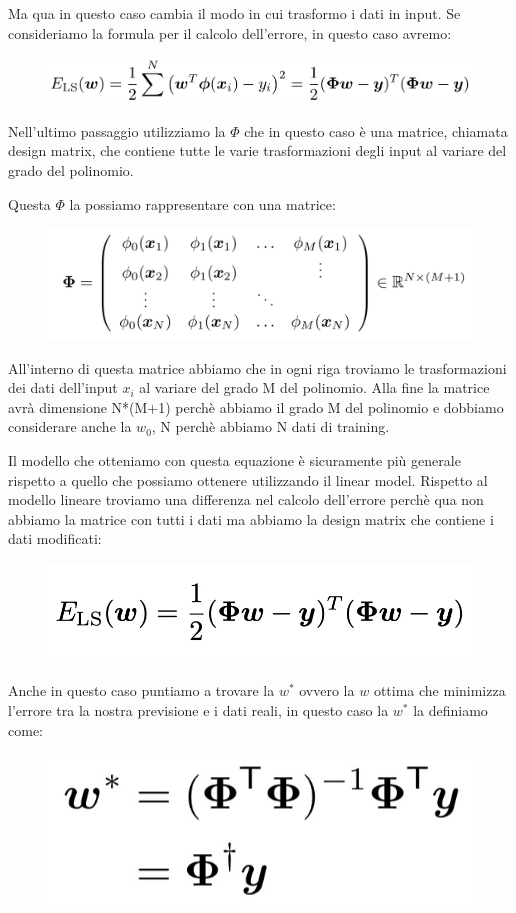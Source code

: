 \documentclass[14pt]{extreport}
\begin{document}
Ma qua in questo caso cambia il modo in cui trasformo i dati in input. Se consideriamo la formula per il calcolo dell'errore, in questo caso avremo:
\begin{figure}[H]
	\centering
	\includegraphics[width=0.7\linewidth]{79.jpeg}
\end{figure}

Nell'ultimo passaggio utilizziamo la $\Phi$ che in questo caso è una matrice, chiamata design matrix, che contiene tutte le varie trasformazioni degli
input al variare del grado del polinomio.

Questa $\Phi$ la possiamo rappresentare con una matrice:

\begin{figure}[H]
	\centering
	\includegraphics[width=0.7\linewidth]{80.jpeg}
\end{figure}


All'interno di questa matrice abbiamo che in ogni riga troviamo le trasformazioni dei dati dell'input $x_i$ al variare del grado M del polinomio. Alla
fine la matrice avrà dimensione N*(M+1) perchè abbiamo il grado M del polinomio e dobbiamo considerare anche la $w_0$, N perchè abbiamo N dati di
training.


Il modello che otteniamo con questa equazione è sicuramente più generale rispetto a quello che possiamo ottenere utilizzando il linear model. Rispetto
al modello lineare troviamo una differenza nel calcolo dell'errore perchè qua non abbiamo la matrice con tutti i dati ma abbiamo la design matrix che
contiene i dati modificati:

\begin{figure}[H]
	\centering
	\includegraphics[width=0.5\linewidth]{81.jpeg}
\end{figure}

Anche in questo caso puntiamo a trovare la $w^*$ ovvero la $w$ ottima che minimizza l'errore tra la nostra previsione e i dati reali, in questo caso
la $w^*$ la definiamo come:
\begin{figure}[H]
	\centering
	\includegraphics[width=0.4\linewidth]{82.jpeg}
\end{figure}
\end{document}
